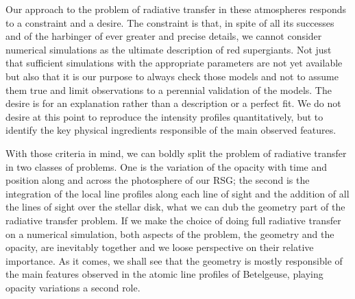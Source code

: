 \documentclass{/Users/art2/TeX/aanda/aa}
\begin{document}
Our approach to the problem of radiative transfer in these atmospheres responds to a constraint and a desire. The constraint is that, in spite 
of all its successes and of the harbinger of ever greater and precise details, we cannot consider numerical simulations as the ultimate description 
of red supergiants. Not just that sufficient simulations with the appropriate parameters are not yet available but also that it is our purpose to always 
check those models and not to assume them true and limit observations to a perennial validation of the models. The desire is for an explanation rather 
than a description or a perfect fit. We do not desire at this point to reproduce the intensity profiles quantitatively, but to identify the key physical 
ingredients responsible of the main observed features. 

With those criteria in mind, we can boldly split the problem of radiative transfer in two classes of problems. One is the variation of the opacity 
with time and position along and across the photosphere of our RSG; the second is the integration of the local line profiles along each line of sight 
and the addition of all the lines of sight over the stellar disk, what we can dub the geometry part of the radiative transfer problem. If we make 
the choice of doing full radiative transfer on a numerical simulation, both aspects of the problem, the geometry and the opacity, are inevitably 
together and we loose perspective on their relative importance. As it comes, we shall see that the geometry is mostly responsible of the main features 
observed in the atomic line profiles of Betelgeuse, playing opacity variations a second role. 
\end{document}
